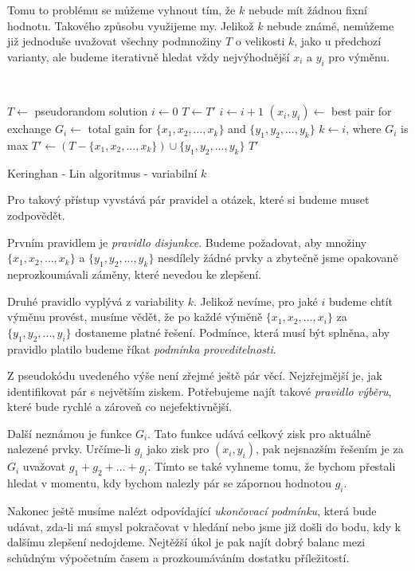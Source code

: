 \documentclass[
  biblatex,
  figures=false,
  glossaries,
  index
]{kidiplom}
\begin{document}
Tomu to problému se můžeme vyhnout tím, že $k$ nebude mít žádnou fixní hodnotu. Takového způsobu využijeme my. Jelikož $k$ nebude známé, nemůžeme již jednoduše uvažovat všechny podmnožiny $T$ o velikosti $k$, jako u předchozí varianty, ale budeme iterativně hledat vždy nejvýhodnější $x_i$ a $y_i$ pro výměnu.
\newline

{\LinesNumbered\SetAlgoNoLine\
\begin{algorithm}[H]
%
$T \leftarrow$ pseudorandom solution\;
{
$i \leftarrow 0$\;
$T \leftarrow T'$\;
{
$i \leftarrow i + 1$\;
$(x_i, y_i) \leftarrow$ best pair for exchange\;
$G_i \leftarrow$ total gain for $\{x_1, x_2, ..., x_k\}$ and $\{y_1, y_2, ..., y_k\}$\;
}
$k \leftarrow i$, where $G_i$ is max \;
$T' \leftarrow (T - \{x_1, x_2, ..., x_k\}) \cup \{y_1, y_2, ..., y_k\}$\;
}
\Return $T'$\;
\caption{Keringhan - Lin algoritmus - variabilní $k$}
\end{algorithm}
}\leavevmode\newline


Pro takový přístup vyvstává pár pravidel a otázek, které si budeme muset zodpovědět.

Prvním pravidlem je \textit{pravidlo disjunkce}. Budeme požadovat, aby množiny $\{x_1, x_2, ..., x_k\}$ a $\{y_1, y_2, ..., y_k\}$ nesdílely žádné prvky a zbytečně jsme opakovaně neprozkoumávali záměny, které nevedou ke zlepšení.

Druhé pravidlo vyplývá z variability $k$. Jelikož nevíme, pro jaké $i$ budeme chtít výměnu provést, musíme vědět, že po každé výměně $\{x_1, x_2, ..., x_i\}$ za $\{y_1, y_2, ..., y_i\}$ dostaneme platné řešení. Podmínce, která musí být splněna, aby pravidlo platilo budeme říkat \textit{podmínka proveditelnosti}.

Z pseudokódu uvedeného výše není zřejmé ještě pár věcí. Nejzřejmější je, jak identifikovat pár s největším ziskem. Potřebujeme najít takové \textit{pravidlo výběru}, které bude rychlé a zároveň co nejefektivnější.

Další neznámou je funkce $G_i$. Tato funkce udává celkový zisk pro aktuálně nalezené prvky. Určíme-li $g_i$ jako zisk pro $(x_i, y_i)$, pak nejsnazším řešením je za $G_i$ uvažovat $g_1 + g_2 + ... + g_i$. Tímto se také vyhneme tomu, že bychom přestali hledat v momentu, kdy bychom nalezly pár se zápornou hodnotou $g_i$.

Nakonec ještě musíme nalézt odpovídající \textit{ukončovací podmínku}, která bude udávat, zda-li má smysl pokračovat v hledání nebo jsme již došli do bodu, kdy k dalšímu zlepšení nedojdeme. Nejtěžší úkol je pak najít dobrý balanc mezi schůdným výpočetním časem a prozkoumáváním dostatku příležitostí.
\end{document}

